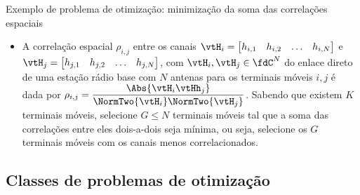 \begin{frame}{\normalsize Exemplo de problema de otimização: minimização da soma das correlações espaciais~\cite{Maciel2006}}
	\begin{itemize}\footnotesize
  \item A correlação espacial $ \rho_{i,j} $ entre os canais $ \vtH_i = \begin{bmatrix} h_{i,1} & h_{i,2} & \ldots &
      h_{i,N} \end{bmatrix}$ e $ \vtH_j = \begin{bmatrix} h_{j,1} & h_{j,2} & \ldots & h_{j,N} \end{bmatrix}$, com
    $\vtH_i, \vtH_j \in \fdC^N $ do enlace direto de uma estação rádio base com $ N $ antenas para os terminais móveis $
    i, j $ é dada por $ \rho_{i,j} = \dfrac{\Abs{\vtH_i \vtHh_j}}{\NormTwo{\vtH_i} \NormTwo{\vtH_j}} $. Sabendo que
    existem $ K $ terminais móveis, selecione $ G \leq N $ terminais móveis tal que a soma das correlações entre eles
    dois-a-dois seja mínima, ou seja, selecione os $ G $ terminais móveis com os canais menos correlacionados.
	\end{itemize}
\end{frame}

\subsection{Classes de problemas de otimização}


